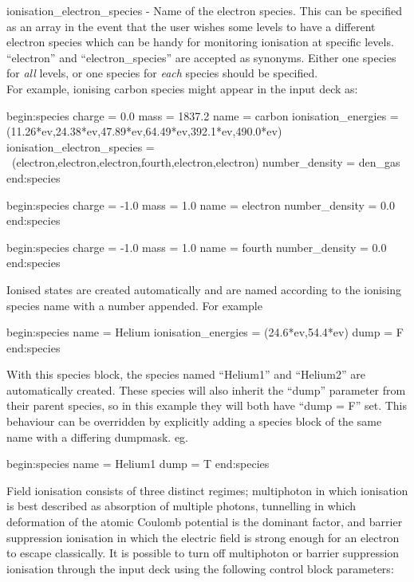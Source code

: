 {\emphtext ionisation\_electron\_species} - Name of the electron species. This
  can be specified as an array in the event that the user wishes some levels
  to have a different electron species which can be handy for monitoring
  ionisation at specific levels. ``electron'' and ``electron\_species'' are
  accepted as synonyms. Either one species for \emph{all} levels, or one species
  for \emph{each} species should be specified. \\

For example, ionising carbon species might appear in the input deck as:

\begin{boxverbatim}
begin:species
   charge = 0.0
   mass = 1837.2
   name = carbon
   ionisation_energies = (11.26*ev,24.38*ev,47.89*ev,64.49*ev,392.1*ev,490.0*ev)
   ionisation_electron_species = \
       (electron,electron,electron,fourth,electron,electron)
   number_density = den_gas
end:species

begin:species
   charge = -1.0
   mass = 1.0
   name = electron
   number_density = 0.0
end:species

begin:species
   charge = -1.0
   mass = 1.0
   name = fourth
   number_density = 0.0
end:species
\end{boxverbatim}

Ionised states are created automatically and are named according to the
ionising species name with a number appended. For example
\begin{boxverbatim}
begin:species
   name = Helium
   ionisation_energies = (24.6*ev,54.4*ev)
   dump = F
end:species
\end{boxverbatim}
With this species block, the species named ``Helium1'' and ``Helium2''
are automatically created. These species will also inherit the ``dump''
parameter from their parent species, so in this example they will both have
``dump = F'' set. This behaviour can be overridden by explicitly
adding a species block of the same name with a differing dumpmask.
eg.
\begin{boxverbatim}
begin:species
   name = Helium1
   dump = T
end:species
\end{boxverbatim}


Field ionisation consists of three distinct regimes; multiphoton in which
ionisation is best described as absorption of multiple photons, tunnelling
in which deformation of the atomic Coulomb potential is the dominant factor,
and barrier suppression ionisation in which the electric field is strong
enough for an electron to escape classically. It is possible to turn off
multiphoton or barrier suppression ionisation through the input deck
using the following control block parameters:\\

